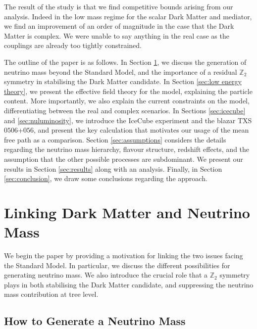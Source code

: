 \documentclass[11pt]{article}
\numberwithin{equation}{section}
\numberwithin{figure}{section}
\numberwithin{table}{section}
\begin{document}
The result of the study is that we find competitive bounds arising from our analysis. Indeed in the low mass regime for the scalar Dark Matter and mediator, we find an improvement of an order of magnitude in the case that the Dark Matter is complex. We were unable to say anything in the real case as the couplings are already too tightly constrained.

The outline of the paper is as follows. In Section \ref{sec:dmneutrinos}, we discuss the generation of neutrino mass beyond the Standard Model, and the importance of a residual $\mathbb{Z}_2$ symmetry in stabilising the Dark Matter candidate. In Section \ref{sec:low energy theory}, we present the effective field theory for the model, explaining the particle content. More importantly, we also explain the current constraints on the model, differentiating between the real and complex scenarios. In Sections \ref{sec:icecube} and \ref{sec:nuluminosity}, we introduce the IceCube experiment and the blazar TXS $0506$+$056$, and present the key calculation that motivates our usage of the mean free path as a comparison. Section \ref{sec:assumptions} considers the details regarding the neutrino mass hierarchy, flavour structure, redshift effects, and the assumption that the other possible processes are subdominant. We present our results in Section \ref{sec:results} along with an analysis. Finally, in Section \ref{sec:conclusion}, we draw some conclusions regarding the approach.





\section{Linking Dark Matter and Neutrino Mass}\label{sec:dmneutrinos}



We begin the paper by providing a motivation for linking the two issues facing the Standard Model. In particular, we discuss the different possibilities for generating neutrino mass. We also introduce the crucial role that a $\mathbb{Z}_2$ symmetry plays in both stabilising the Dark Matter candidate, and suppressing the neutrino mass contribution at tree level.


\subsection{How to Generate a Neutrino Mass}
\end{document}

